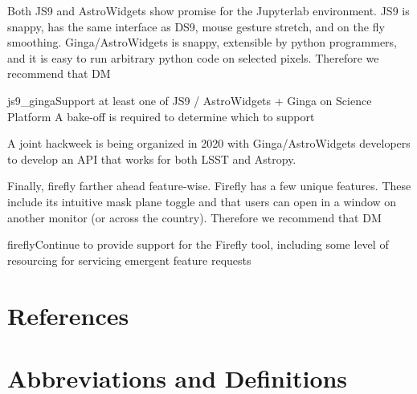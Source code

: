 \documentclass[DM,authoryear,toc]{lsstdoc}
\begin{document}
Both JS9 and AstroWidgets show promise for the Jupyterlab environment.
JS9 is snappy, has the same interface as DS9, mouse gesture stretch, and on the fly smoothing.
Ginga/AstroWidgets is snappy, extensible by python programmers, and it is easy to run arbitrary python code on selected pixels.
Therefore we recommend that DM
\begin{recommendation}{js9_ginga}{Support at least one of JS9 / AstroWidgets + Ginga on Science Platform}
A bake-off is required to determine which to support
\end{recommendation}

A joint hackweek is being organized in 2020 with Ginga/AstroWidgets developers to develop an API that works for both LSST and Astropy.

Finally, firefly farther ahead feature-wise.
Firefly has a few unique features.
These include its intuitive mask plane toggle and that users can open in a window on another monitor (or across the country).
Therefore we recommend that DM
\begin{recommendation}{firefly}{Continue to provide support for the Firefly tool, including some level of resourcing for servicing emergent feature requests}
\end{recommendation}


\appendix

\section{References}
\label{sec:bib}


\section{Abbreviations and Definitions}
\label{sec:acronyms}

\end{document}
